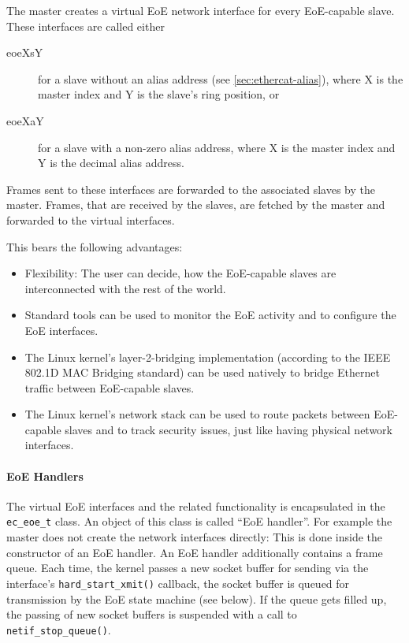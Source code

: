 \documentclass[a4paper,12pt,BCOR6mm,bibtotoc,idxtotoc]{scrbook}
\begin{document}
The master creates a virtual EoE network interface for every EoE-capable
slave. These interfaces are called either

\begin{description}

\item[eoeXsY] for a slave without an alias address (see
\autoref{sec:ethercat-alias}), where X is the master index and Y is the
slave's ring position, or

\item[eoeXaY] for a slave with a non-zero alias address, where X is the master
index and Y is the decimal alias address.

\end{description}

Frames sent to these interfaces are forwarded to the associated slaves by the
master. Frames, that are received by the slaves, are fetched by the master and
forwarded to the virtual interfaces.

This bears the following advantages:

\begin{itemize}

\item Flexibility: The user can decide, how the EoE-capable slaves are
interconnected with the rest of the world.

\item Standard tools can be used to monitor the EoE activity and to configure
the EoE interfaces.

\item The Linux kernel's layer-2-bridging implementation (according to the
IEEE 802.1D MAC Bridging standard) can be used natively to bridge Ethernet
traffic between EoE-capable slaves.

\item The Linux kernel's network stack can be used to route packets between
EoE-capable slaves and to track security issues, just like having physical
network interfaces.

\end{itemize}

\paragraph{EoE Handlers}

The virtual EoE interfaces and the related functionality is encapsulated in
the \lstinline+ec_eoe_t+ class. An object of this class is called ``EoE
handler''. For example the master does not create the network interfaces
directly: This is done inside the constructor of an EoE handler. An EoE
handler additionally contains a frame queue. Each time, the kernel passes a
new socket buffer for sending via the interface's
\lstinline+hard_start_xmit()+ callback, the socket buffer is queued for
transmission by the EoE state machine (see below). If the queue gets filled
up, the passing of new socket buffers is suspended with a call to
\lstinline+netif_stop_queue()+.
\end{document}
